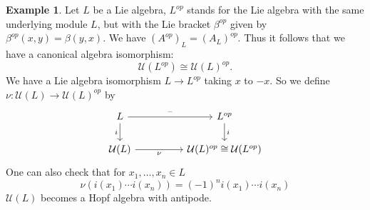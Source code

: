 \documentclass[8pt]{article}
\theoremstyle{definition}
\theoremstyle{definition}
\theoremstyle{definition}
\theoremstyle{definition}
\theoremstyle{definition}
\theoremstyle{definition}
\theoremstyle{definition}
\theoremstyle{definition}
\theoremstyle{definition}
\theoremstyle{definition}
\theoremstyle{definition}
\theoremstyle{definition}
\newtheorem{example}{Example}[section]
\theoremstyle{definition}
\theoremstyle{definition}
\theoremstyle{question}
\begin{document}
\begin{example}
  Let $L$ be a Lie algebra, $L^{op}$ stands for the Lie algebra with the same underlying module $L$,
  but with the Lie bracket $\beta^{op}$ given by $\beta^{op}(x, y) = \beta(y,x)$. We have $(A^{op})_L = (A_L)^{op}$.
  Thus it follows that we have a canonical algebra isomorphism:
  \[
  \mathcal{U}(L^{op}) \cong \mathcal{U}(L)^{op}.
  \]
  We have a Lie algebra isomorphism $L \to L^{op}$ taking $x$ to $-x$. So we define $\nu : \mathcal{U}(L) \to \mathcal{U}(L)^{op}$
  by
  \[
  \begin{tikzcd}
    L \ar[rr, "-"] \ar[d, "i"'] && L^{op} \ar[d, "i"] \\
    \mathcal{U}(L) \ar[rr, "\nu"'] && \mathcal{U}(L)^{op} \cong \mathcal{U}(L^{op})
  \end{tikzcd}
  \]
  One can also check that for $x_1, \ldots, x_n \in L$
  \[
  \nu(i(x_1) \cdots i(x_n)) = (-1)^n i(x_1) \cdots i(x_n)
  \]
  $\mathcal{U}(L)$ becomes a Hopf algebra with antipode.
\end{example}
\end{document}

